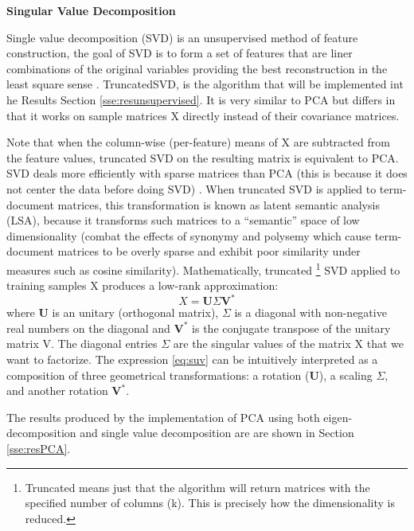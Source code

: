 \documentclass[11pt]{article}
\theoremstyle{definition}
\theoremstyle{remark}
\begin{document}
\textbf{Singular Value Decomposition}

Single value decomposition (SVD) is an unsupervised method of feature construction, the goal of SVD is to form a set of features that are liner combinations of the original variables providing the best reconstruction in the least square sense \cite{duda2012pattern}. TruncatedSVD, is the algorithm that will be implemented int he Results Section \ref{sse:resunsupervised}. It is very similar to PCA but differs in that it works on sample matrices X directly instead of their covariance matrices. 

Note that when the column-wise (per-feature) means of X are subtracted from the feature values, truncated SVD on the resulting matrix is equivalent to PCA. SVD deals more efficiently with sparse matrices than PCA (this is because it does not center the data before doing SVD) \cite{halko2009finding}. When truncated SVD is applied to term-document matrices, this transformation is known as latent semantic analysis (LSA), because it transforms such matrices to a “semantic” space of low dimensionality (combat the effects of synonymy and polysemy which cause term-document matrices to be overly sparse and exhibit poor similarity under measures such as cosine similarity).
Mathematically, truncated \footnote{Truncated means just that the algorithm will return matrices with the specified number of columns (k). This is precisely how the dimensionality is reduced.} SVD applied to training samples X produces a low-rank approximation:
\begin{equation}
X = \mathbf{U} \Sigma \mathbf{V}^{*}
\label{eq:suv}
\end{equation}
where $\mathbf{U}$ is an unitary (orthogonal matrix), $\Sigma$ is a diagonal with non-negative real numbers on the diagonal and $\mathbf{V} ^{*}$ is the  conjugate transpose of the unitary matrix V. The diagonal entries $\Sigma$ are the singular values of the matrix X that we want to factorize. The expression \ref{eq:suv} can be intuitively interpreted as a composition of three geometrical transformations: a rotation ($\mathbf {U}$), a scaling $\Sigma$, and another rotation $\mathbf{V}^{*}$.

The results produced by the implementation of PCA using both eigen-decomposition and single value decomposition are are shown in Section \ref{sse:resPCA}.
\end{document}
